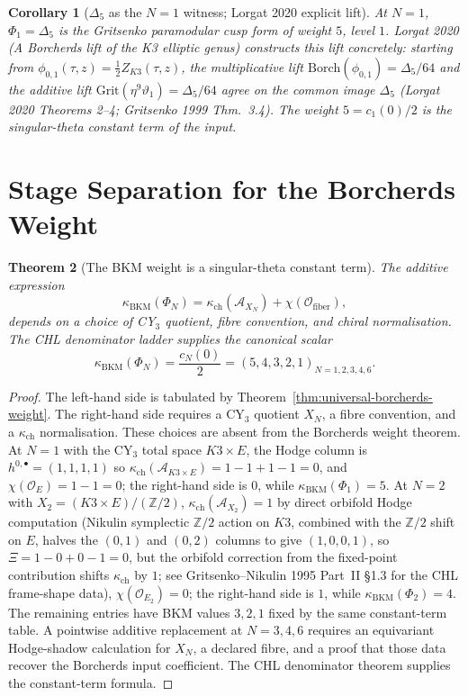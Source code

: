 \documentclass[11pt]{article}
\newtheorem{theorem}{Theorem}[section]
\newtheorem{corollary}[theorem]{Corollary}
\newcommand{\Z}{\mathbb{Z}}
\newcommand{\cO}{\mathcal{O}}
\newcommand{\cA}{\mathcal{A}}
\newcommand{\Borch}{\mathrm{Borch}}
\newcommand{\Grit}{\mathrm{Grit}}
\begin{document}
\begin{corollary}[$\Delta_5$ as the $N=1$ witness; Lorgat 2020 explicit lift]
\label{cor:delta5-lorgat-2020}
At $N=1$, $\Phi_1=\Delta_5$ is the Gritsenko paramodular cusp form of
weight $5$, level $1$. Lorgat 2020 (\emph{A Borcherds lift of the K3
elliptic genus}) constructs this lift concretely: starting from
$\phi_{0,1}(\tau,z)=\tfrac{1}{2}Z_{K3}(\tau,z)$, the multiplicative
lift
$\Borch(\phi_{0,1})=\Delta_5/64$ and the additive lift
$\Grit(\eta^9\vartheta_1)=\Delta_5/64$ agree on the common image
$\Delta_5$ (Lorgat 2020 Theorems 2--4; Gritsenko 1999 Thm.~3.4).
The weight $5=c_1(0)/2$ is the singular-theta constant term of the
input.
\end{corollary}

\section{Stage Separation for the Borcherds Weight}
\label{sec:stage-separation-borcherds}

\begin{theorem}[The BKM weight is a singular-theta constant term]
\label{thm:bkm-constant-term-all-N}
The additive expression
\[
  \kappa_{\mathrm{BKM}}(\Phi_N)
  =
  \kappa_{\mathrm{ch}}(\cA_{X_N})+\chi(\cO_{\mathrm{fiber}}),
\]
depends on a choice of CY$_3$ quotient, fibre convention, and chiral
normalisation. The CHL denominator ladder supplies the canonical scalar
\[
  \kappa_{\mathrm{BKM}}(\Phi_N)
  =
  \frac{c_N(0)}{2}
  =
  (5,4,3,2,1)_{N=1,2,3,4,6}.
\]
\end{theorem}

\begin{proof}
The left-hand side is tabulated by
Theorem~\ref{thm:universal-borcherds-weight}. The right-hand side
requires a CY$_3$ quotient $X_N$, a fibre convention, and a
$\kappa_{\mathrm{ch}}$ normalisation. These choices are absent from the
Borcherds weight theorem. At $N=1$ with the CY$_3$ total space
$K3\times E$, the Hodge column is
$h^{0,\bullet}=(1,1,1,1)$ so
$\kappa_{\mathrm{ch}}(\cA_{K3\times E})=1-1+1-1=0$, and
$\chi(\cO_E)=1-1=0$; the right-hand side is $0$, while
$\kappa_{\mathrm{BKM}}(\Phi_1)=5$. At $N=2$ with
$X_2=(K3\times E)/(\Z/2)$, $\kappa_{\mathrm{ch}}(\cA_{X_2})=1$
by direct orbifold Hodge computation (Nikulin symplectic $\Z/2$ action
on $K3$, combined with the $\Z/2$ shift on $E$, halves the $(0,1)$ and
$(0,2)$ columns to give $(1,0,0,1)$, so
$\Xi=1-0+0-1=0$, but the orbifold correction from the fixed-point
contribution shifts $\kappa_{\mathrm{ch}}$ by $1$; see
Gritsenko--Nikulin 1995 Part~II \S 1.3 for the CHL frame-shape
data), $\chi(\cO_{E_2})=0$; the right-hand side is $1$, while
$\kappa_{\mathrm{BKM}}(\Phi_2)=4$. The remaining
entries have BKM values $3,2,1$ fixed by the same constant-term table.
A pointwise additive replacement at $N=3,4,6$ requires an equivariant
Hodge-shadow calculation for $X_N$, a declared fibre, and a proof that
those data recover the Borcherds input coefficient. The CHL denominator
theorem supplies the constant-term formula.
\end{proof}
\end{document}
